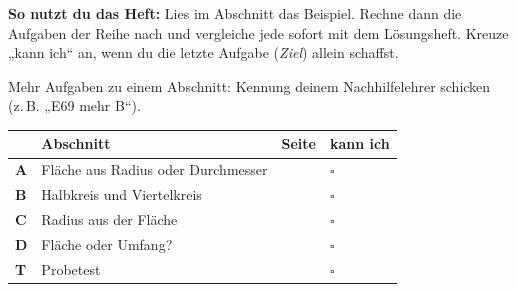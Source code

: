 \documentclass[11pt]{article}
\newlength{\kr}
\begin{document}
\par\smallskip
{}\par\medskip
\noindent\textbf{So nutzt du das Heft:} Lies im Abschnitt das Beispiel. Rechne dann die Aufgaben der Reihe nach und vergleiche jede sofort mit dem Lösungsheft. Kreuze „kann ich“ an, wenn du die letzte Aufgabe (\emph{Ziel}) allein schaffst.\par
\noindent Mehr Aufgaben zu einem Abschnitt: Kennung deinem Nachhilfelehrer schicken (z.\,B. „E69 mehr B“).\par\medskip
{\renewcommand{\arraystretch}{1.3}
\noindent\begin{tabular}{|>{\bfseries}p{10mm}|p{112mm}|>{\raggedleft\arraybackslash}p{10mm}|>{\centering\arraybackslash}p{14mm}|}\hline
\rowcolor{black!8} & \textbf{Abschnitt} & \textbf{Seite} & \textbf{kann ich}\\\hline
A & Fläche aus Radius oder Durchmesser & \pageref{s:A} & $\square$\\\hline
B & Halbkreis und Viertelkreis & \pageref{s:B} & $\square$\\\hline
C & Radius aus der Fläche & \pageref{s:C} & $\square$\\\hline
D & Fläche oder Umfang? & \pageref{s:D} & $\square$\\\hline
T & Probetest & \pageref{s:T} & $\square$\\\hline
\end{tabular}}\par\bigskip
\end{document}
